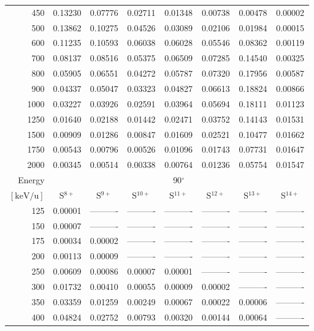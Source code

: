 \begin{table}[ht]
\begin{tabular}{r|c|c|c|c|c|c|c}
      450 & 0.13230 & 0.07776 & 0.02711 & 0.01348 & 0.00738 & 0.00478 & 0.00002 \\
      500 & 0.13862 & 0.10275 & 0.04526 & 0.03089 & 0.02106 & 0.01984 & 0.00015 \\
      600 & 0.11235 & 0.10593 & 0.06038 & 0.06028 & 0.05546 & 0.08362 & 0.00119 \\
      700 & 0.08137 & 0.08516 & 0.05375 & 0.06509 & 0.07285 & 0.14540 & 0.00325 \\
      800 & 0.05905 & 0.06551 & 0.04272 & 0.05787 & 0.07320 & 0.17956 & 0.00587 \\
      900 & 0.04337 & 0.05047 & 0.03323 & 0.04827 & 0.06613 & 0.18824 & 0.00866 \\
     1000 & 0.03227 & 0.03926 & 0.02591 & 0.03964 & 0.05694 & 0.18111 & 0.01123 \\
     1250 & 0.01640 & 0.02188 & 0.01442 & 0.02471 & 0.03752 & 0.14143 & 0.01531 \\
     1500 & 0.00909 & 0.01286 & 0.00847 & 0.01609 & 0.02521 & 0.10477 & 0.01662 \\
     1750 & 0.00543 & 0.00796 & 0.00526 & 0.01096 & 0.01743 & 0.07731 & 0.01647 \\
     2000 & 0.00345 & 0.00514 & 0.00338 & 0.00764 & 0.01236 & 0.05754 & 0.01547 \\ \cline{1-8}
    Energy & \multicolumn{7}{c}{90$^\circ$} \\ \cline{2-8}
    $\mathrm{[keV/u]}$ & S$^{8+}$ & S$^{9+}$ & S$^{10+}$ & S$^{11+}$ & S$^{12+}$ & S$^{13+}$ & S$^{14+}$ \\ \cline{1-8}
      125 & 0.00001 & ---------- & ---------- & ---------- & ---------- & ---------- & ---------- \\
      150 & 0.00007 & ---------- & ---------- & ---------- & ---------- & ---------- & ---------- \\
      175 & 0.00034 & 0.00002 & ---------- & ---------- & ---------- & ---------- & ---------- \\
      200 & 0.00113 & 0.00009 & ---------- & ---------- & ---------- & ---------- & ---------- \\
      250 & 0.00609 & 0.00086 & 0.00007 & 0.00001 & ---------- & ---------- & ---------- \\
      300 & 0.01732 & 0.00410 & 0.00055 & 0.00009 & 0.00002 & ---------- & ---------- \\
      350 & 0.03359 & 0.01259 & 0.00249 & 0.00067 & 0.00022 & 0.00006 & ---------- \\
      400 & 0.04824 & 0.02752 & 0.00793 & 0.00320 & 0.00144 & 0.00064 & ---------- \\

\end{tabular}
\end{table}
